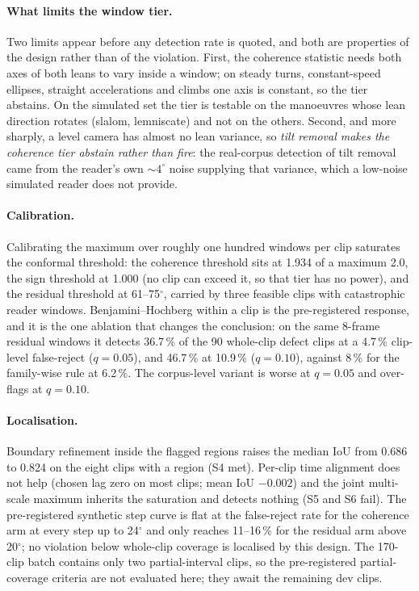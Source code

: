 \paragraph{What limits the window tier.}
Two limits appear before any detection rate is quoted, and both are properties of the design
rather than of the violation. First, the coherence statistic needs both axes of both leans to
vary inside a window; on steady turns, constant-speed ellipses, straight accelerations and
climbs one axis is constant, so the tier abstains. On the simulated set the tier is testable on
the manoeuvres whose lean direction rotates (slalom, lemniscate) and not on the others. Second,
and more sharply, a level camera has almost no lean variance, so \emph{tilt removal makes the
coherence tier abstain rather than fire}: the real-corpus detection of tilt removal came from
the reader's own $\sim4^\circ$ noise supplying that variance, which a low-noise simulated reader
does not provide.

\paragraph{Calibration.}
Calibrating the maximum over roughly one hundred windows per clip saturates the conformal
threshold: the coherence threshold sits at 1.934 of a maximum 2.0, the sign threshold at 1.000
(no clip can exceed it, so that tier has no power), and the residual threshold at 61--75$^\circ$,
carried by three feasible clips with catastrophic reader windows. Benjamini--Hochberg within a
clip is the pre-registered response, and it is the one ablation that changes the conclusion: on
the same 8-frame residual windows it detects 36.7\,\% of the 90 whole-clip defect clips at a
4.7\,\% clip-level false-reject ($q=0.05$), and 46.7\,\% at 10.9\,\% ($q=0.10$), against
8\,\% for the family-wise rule at 6.2\,\%. The corpus-level variant is worse at $q=0.05$ and
over-flags at $q=0.10$.

\paragraph{Localisation.}
Boundary refinement inside the flagged regions raises the median IoU from 0.686 to 0.824 on the
eight clips with a region (S4 met). Per-clip time alignment does not help (chosen lag zero on
most clips; mean IoU $-0.002$) and the joint multi-scale maximum inherits the saturation and
detects nothing (S5 and S6 fail). The pre-registered synthetic step curve is flat at the
false-reject rate for the coherence arm at every step up to 24$^\circ$ and only reaches 11--16\,\%
for the residual arm above 20$^\circ$; no violation below whole-clip coverage is localised by
this design. The 170-clip batch contains only two partial-interval clips, so the pre-registered
partial-coverage criteria are not evaluated here; they await the remaining dev clips.

